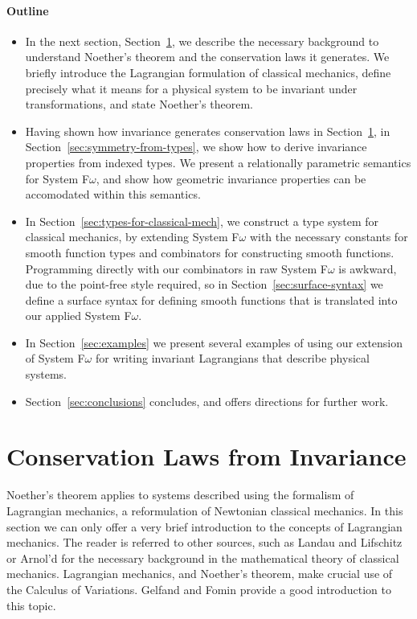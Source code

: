 \documentclass[preprint]{sigplanconf}
\theoremstyle{examplestyle}
\begin{document}
\paragraph{Outline}

\begin{itemize}
\item In the next section,
  Section~\ref{sec:conservation-laws-from-symmetry}, we describe the
  necessary background to understand Noether's theorem and the
  conservation laws it generates. We briefly introduce the Lagrangian
  formulation of classical mechanics, define precisely what it means
  for a physical system to be invariant under transformations, and
  state Noether's theorem.
\item Having shown how invariance generates conservation laws in
  Section~\ref{sec:conservation-laws-from-symmetry}, in
  Section~\ref{sec:symmetry-from-types}, we show how to derive
  invariance properties from indexed types. We present a relationally
  parametric semantics for System F$\omega$, and show how geometric
  invariance properties can be accomodated within this semantics.
\item In Section~\ref{sec:types-for-classical-mech}, we construct a
  type system for classical mechanics, by extending System F$\omega$
  with the necessary constants for smooth function types and
  combinators for constructing smooth functions. Programming directly
  with our combinators in raw System F$\omega$ is awkward, due to the
  point-free style required, so in Section~\ref{sec:surface-syntax} we
  define a surface syntax for defining smooth functions that is
  translated into our applied System F$\omega$.
\item In Section~\ref{sec:examples} we present several examples of
  using our extension of System F$\omega$ for writing invariant
  Lagrangians that describe physical systems.
\item Section~\ref{sec:conclusions} concludes, and offers directions
  for further work.
\end{itemize}

\section{Conservation Laws from Invariance}
\label{sec:conservation-laws-from-symmetry}

Noether's theorem applies to systems described using the formalism of
Lagrangian mechanics, a reformulation of Newtonian classical
mechanics. In this section we can only offer a very brief introduction
to the concepts of Lagrangian mechanics. The reader is referred to
other sources, such as Landau and Lifschitz \cite{landau60mechanics}
or Arnol'd \cite{arnoldXXmathematical} for the necessary background in
the mathematical theory of classical mechanics. Lagrangian mechanics,
and Noether's theorem, make crucial use of the Calculus of
Variations. Gelfand and Fomin \cite{gelfandXXcalculus} provide a good
introduction to this topic.
\end{document}
